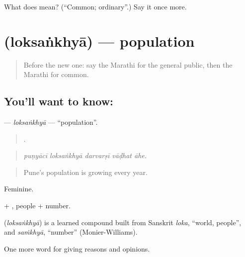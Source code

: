 \begin{tcolorbox}[breakable,colback=teal!4,colframe=teal!35!black,title={Before you move on}]
What does  mean? (\textquotedblleft{}Common; ordinary\textquotedblright{}.) Say it once more.
\end{tcolorbox}
\section[\texorpdfstring{\mr{लोकसंख्या} (loksaṅkhyā)}{लोकसंख्या (loksaṅkhyā)}]{ (loksaṅkhyā) — population}

\label{lesson:MR-C354-loksankhya}



\begin{quote}
Before the new one: say the Marathi for the general public, then the Marathi for common.
\end{quote}

\subsection*{You'll want to know: }
\textbf{} — \emph{loksaṅkhyā} — \textquotedblleft{}population\textquotedblright{}.

\begin{quote}
    .
\end{quote}

\begin{quote}
\emph{puṇyācī loksaṅkhyā darvarṣī vāḍhat āhe.}
\end{quote}

\begin{quote}
Pune's population is growing every year.
\end{quote}

Feminine.

 + , people + number.

\begin{cousinweb}
\textbf{} (\emph{loksaṅkhyā}) is a learned compound built from Sanskrit \emph{loka}, \textquotedblleft{}world, people\textquotedblright{}, and \emph{saṁkhyā}, \textquotedblleft{}number\textquotedblright{} (Monier-Williams).
\end{cousinweb}

\begin{grammarlens}[title={What you've built}]
One more word for giving reasons and opinions.
\end{grammarlens}

